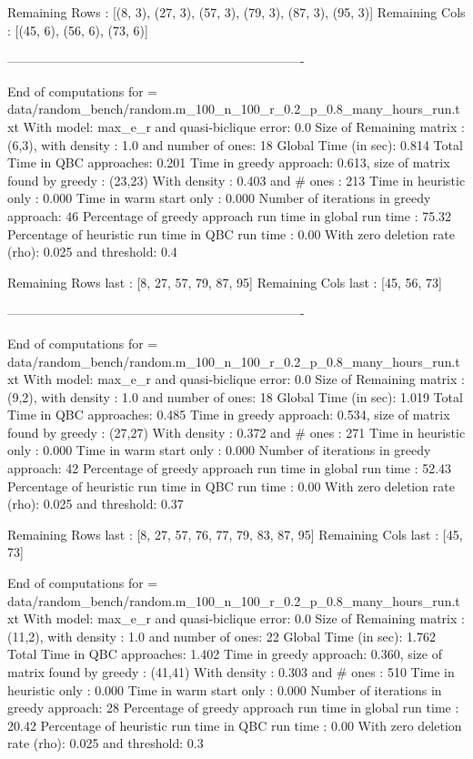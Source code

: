  Remaining Rows  : [(8, 3), (27, 3), (57, 3), (79, 3), (87, 3), (95, 3)]
 Remaining  Cols  : [(45, 6), (56, 6), (73, 6)]

----------------------------------------------------------------------
 
    End of computations for = data/random_bench/random.m_100_n_100_r_0.2_p_0.8_many_hours_run.txt 
    With  model: max_e_r and quasi-biclique error: 0.0
    Size of Remaining matrix : (6,3), with  density : 1.0 and number of ones: 18
    Global Time (in sec): 0.814
    Total Time in QBC approaches: 0.201
    Time in greedy approach: 0.613,  size of matrix found by greedy : (23,23) 
    With density : 0.403 and # ones : 213 
    Time in heuristic only : 0.000 
    Time in warm start only : 0.000
    Number of iterations in greedy approach: 46
    Percentage of greedy approach run time in global run time : 75.32%
    Percentage of heuristic run time in QBC run time : 0.00%
    With zero deletion rate (rho): 0.025 and threshold: 0.4
    
 Remaining Rows last : [8, 27, 57, 79, 87, 95]
 Remaining  Cols  last : [45, 56, 73]
    
    
    ----------------------------------------------------------------------
 
    End of computations for = data/random_bench/random.m_100_n_100_r_0.2_p_0.8_many_hours_run.txt 
    With  model: max_e_r and quasi-biclique error: 0.0
    Size of Remaining matrix : (9,2), with  density : 1.0 and number of ones: 18
    Global Time (in sec): 1.019
    Total Time in QBC approaches: 0.485
    Time in greedy approach: 0.534,  size of matrix found by greedy : (27,27) 
    With density : 0.372 and # ones : 271 
    Time in heuristic only : 0.000 
    Time in warm start only : 0.000
    Number of iterations in greedy approach: 42
    Percentage of greedy approach run time in global run time : 52.43%
    Percentage of heuristic run time in QBC run time : 0.00%
    With zero deletion rate (rho): 0.025 and threshold: 0.37
    
 Remaining Rows last : [8, 27, 57, 76, 77, 79, 83, 87, 95]
 Remaining  Cols  last : [45, 73]
     
    End of computations for = data/random_bench/random.m_100_n_100_r_0.2_p_0.8_many_hours_run.txt 
    With  model: max_e_r and quasi-biclique error: 0.0
    Size of Remaining matrix : (11,2), with  density : 1.0 and number of ones: 22
    Global Time (in sec): 1.762
    Total Time in QBC approaches: 1.402
    Time in greedy approach: 0.360,  size of matrix found by greedy : (41,41) 
    With density : 0.303 and # ones : 510 
    Time in heuristic only : 0.000 
    Time in warm start only : 0.000
    Number of iterations in greedy approach: 28
    Percentage of greedy approach run time in global run time : 20.42%
    Percentage of heuristic run time in QBC run time : 0.00%
    With zero deletion rate (rho): 0.025 and threshold: 0.3
    
